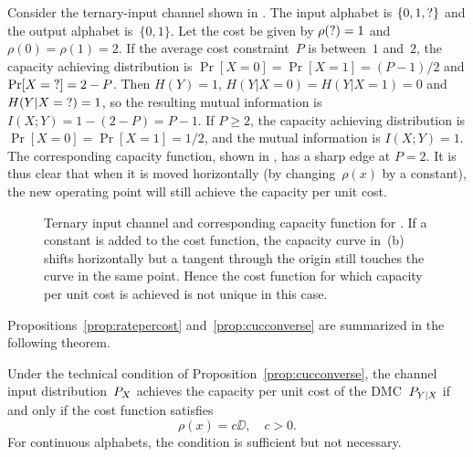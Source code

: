 \begin{example}
  \label{ex:nondiffcapacity}
  Consider the ternary-input channel shown in . The
  input alphabet is $\{0,1,\?\}$ and the output alphabet
  is~$\{0,1\}$. Let the cost be given by $\rho(\?) = 1$ and $\rho(0) = \rho(1) =
  2$. If the average cost constraint~$P$ is between~$1$ and~$2$, the capacity
  achieving distribution is $\Pr[X=0] = \Pr[X=1] = (P-1)/2$ and $\Pr[X = \?] = 2
  - P$. Then $H(Y) = 1$, $H(Y|X=0) = H(Y|X=1) = 0$ and $H(Y|X=\?) = 1$, so the
  resulting mutual information is $I(X;Y) = 1 - (2-P) = P - 1$.  If $P \ge 2$,
  the capacity achieving distribution is $\Pr[X=0] = \Pr[X = 1] = 1/2$, and the
  mutual information is $I(X;Y) = 1$. The corresponding capacity function, shown
  in , has a sharp edge at $P=2$. It is thus clear that
  when it is moved horizontally (by changing~$\rho(x)$ by a constant), the new
  operating point will still achieve the capacity per unit cost.
  \begin{figure}
    \centerline{%
      \hfil
      }%
    \caption{Ternary input channel and corresponding capacity function for
    . If a constant is added to the cost function, the
    capacity curve in~(b) shifts horizontally but a tangent through the origin
    still touches the curve in the same point. Hence the cost function for which
    capacity per unit cost is achieved is not unique in this case.}
  \end{figure}
\end{example}

Propositions~\ref{prop:ratepercost} and~\ref{prop:cucconverse} are summarized
in the following theorem. 

\begin{theorem}
  \label{thm:cuccond}
  Under the technical condition of Proposition~\ref{prop:cucconverse}, the
  channel input distribution~$P_X$ achieves the capacity per unit cost of the
  DMC~$P_{Y|X}$ if and only if the cost function satisfies
  \begin{equation}
    \label{eq:optcostthm}
    \rho(x) = c \DD, \quad c > 0. 
  \end{equation}
  For continuous alphabets, the condition is sufficient but not necessary.
\end{theorem}

